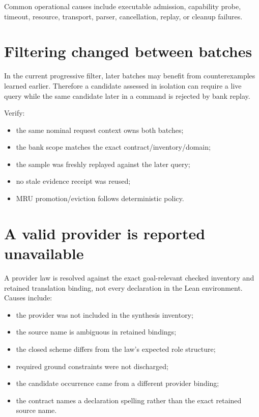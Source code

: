 \documentclass[10pt,letterpaper,oneside]{report}
\begin{document}
Common operational causes include executable admission, capability probe, timeout, resource, transport, parser, cancellation, replay, or cleanup failures.

\section{Filtering changed between batches}

In the current progressive filter, later batches may benefit from counterexamples learned earlier. Therefore a candidate assessed in isolation can require a live query while the same candidate later in a command is rejected by bank replay.

Verify:

\begin{itemize}
\item the same nominal request context owns both batches;
\item the bank scope matches the exact contract/inventory/domain;
\item the sample was freshly replayed against the later query;
\item no stale evidence receipt was reused;
\item MRU promotion/eviction follows deterministic policy.
\end{itemize}

\section{A valid provider is reported unavailable}

A provider law is resolved against the exact goal-relevant checked inventory and retained translation binding, not every declaration in the Lean environment. Causes include:

\begin{itemize}
\item the provider was not included in the synthesis inventory;
\item the source name is ambiguous in retained bindings;
\item the closed scheme differs from the law's expected role structure;
\item required ground constraints were not discharged;
\item the candidate occurrence came from a different provider binding;
\item the contract names a declaration spelling rather than the exact retained source name.
\end{itemize}
\end{document}
